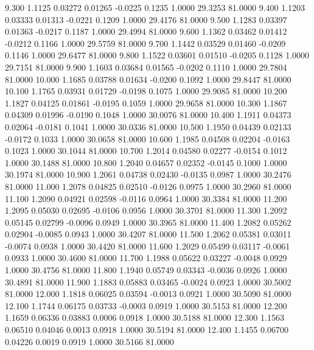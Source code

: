    9.300   1.1125   0.03272   0.01265  -0.0225   0.1235   1.0000  29.3253  81.0000
   9.400   1.1203   0.03333   0.01313  -0.0221   0.1209   1.0000  29.4176  81.0000
   9.500   1.1283   0.03397   0.01363  -0.0217   0.1187   1.0000  29.4994  81.0000
   9.600   1.1362   0.03462   0.01412  -0.0212   0.1166   1.0000  29.5759  81.0000
   9.700   1.1442   0.03529   0.01460  -0.0209   0.1146   1.0000  29.6477  81.0000
   9.800   1.1522   0.03601   0.01510  -0.0205   0.1128   1.0000  29.7151  81.0000
   9.900   1.1603   0.03684   0.01565  -0.0202   0.1110   1.0000  29.7804  81.0000
  10.000   1.1685   0.03788   0.01634  -0.0200   0.1092   1.0000  29.8447  81.0000
  10.100   1.1765   0.03931   0.01729  -0.0198   0.1075   1.0000  29.9085  81.0000
  10.200   1.1827   0.04125   0.01861  -0.0195   0.1059   1.0000  29.9658  81.0000
  10.300   1.1867   0.04309   0.01996  -0.0190   0.1048   1.0000  30.0076  81.0000
  10.400   1.1911   0.04373   0.02064  -0.0181   0.1041   1.0000  30.0336  81.0000
  10.500   1.1950   0.04439   0.02133  -0.0172   0.1033   1.0000  30.0658  81.0000
  10.600   1.1985   0.04508   0.02204  -0.0163   0.1023   1.0000  30.1044  81.0000
  10.700   1.2014   0.04580   0.02277  -0.0154   0.1012   1.0000  30.1488  81.0000
  10.800   1.2040   0.04657   0.02352  -0.0145   0.1000   1.0000  30.1974  81.0000
  10.900   1.2061   0.04738   0.02430  -0.0135   0.0987   1.0000  30.2476  81.0000
  11.000   1.2078   0.04825   0.02510  -0.0126   0.0975   1.0000  30.2960  81.0000
  11.100   1.2090   0.04921   0.02598  -0.0116   0.0964   1.0000  30.3384  81.0000
  11.200   1.2095   0.05030   0.02695  -0.0106   0.0956   1.0000  30.3701  81.0000
  11.300   1.2092   0.05145   0.02799  -0.0096   0.0949   1.0000  30.3965  81.0000
  11.400   1.2082   0.05262   0.02904  -0.0085   0.0943   1.0000  30.4207  81.0000
  11.500   1.2062   0.05381   0.03011  -0.0074   0.0938   1.0000  30.4420  81.0000
  11.600   1.2029   0.05499   0.03117  -0.0061   0.0933   1.0000  30.4600  81.0000
  11.700   1.1988   0.05622   0.03227  -0.0048   0.0929   1.0000  30.4756  81.0000
  11.800   1.1940   0.05749   0.03343  -0.0036   0.0926   1.0000  30.4891  81.0000
  11.900   1.1883   0.05883   0.03465  -0.0024   0.0923   1.0000  30.5002  81.0000
  12.000   1.1818   0.06025   0.03594  -0.0013   0.0921   1.0000  30.5090  81.0000
  12.100   1.1744   0.06175   0.03733  -0.0003   0.0919   1.0000  30.5153  81.0000
  12.200   1.1659   0.06336   0.03883   0.0006   0.0918   1.0000  30.5188  81.0000
  12.300   1.1563   0.06510   0.04046   0.0013   0.0918   1.0000  30.5194  81.0000
  12.400   1.1455   0.06700   0.04226   0.0019   0.0919   1.0000  30.5166  81.0000
